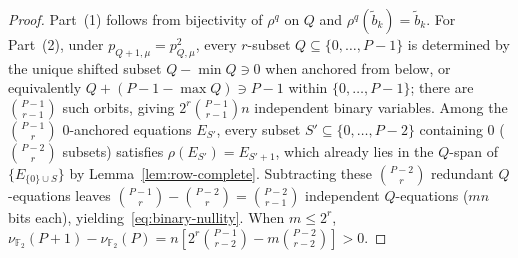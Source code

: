 \documentclass[11pt,a4paper]{article}
\theoremstyle{definition}
\theoremstyle{remark}
\newcommand{\Ftwo}{\mathbb{F}_2}
\begin{document}
\begin{proof}
Part~(1) follows from bijectivity of $\rho^q$ on $Q$ and $\rho^q(\tilde{b}_k) = \tilde{b}_k$. For Part~(2), under $p_{Q+1,\mu} = p_{Q,\mu}^2$, every $r$-subset $Q \subseteq \{0, \dots, P-1\}$ is determined by the unique shifted subset $Q - \min Q \ni 0$ when anchored from below, or equivalently $Q + (P - 1 - \max Q) \ni P - 1$ within $\{0, \dots, P-1\}$; there are $\binom{P-1}{r-1}$ such orbits, giving $2^r \binom{P-1}{r-1} n$ independent binary variables. Among the $\binom{P-1}{r}$ $0$-anchored equations $E_{S'}$, every subset $S' \subseteq \{0, \dots, P-2\}$ containing $0$ ($\binom{P-2}{r}$ subsets) satisfies $\rho(E_{S'}) = E_{S'+1}$, which already lies in the $Q$-span of $\{E_{\{0\}\cup S}\}$ by Lemma~\ref{lem:row-complete}. Subtracting these $\binom{P-2}{r}$ redundant $Q$-equations leaves $\binom{P-1}{r} - \binom{P-2}{r} = \binom{P-2}{r-1}$ independent $Q$-equations ($mn$ bits each), yielding~\eqref{eq:binary-nullity}. When $m \le 2^r$, $\nu_{\Ftwo}(P+1) - \nu_{\Ftwo}(P) = n[2^r\binom{P-1}{r-2} - m\binom{P-2}{r-2}] > 0$.
\end{proof}
\end{document}
